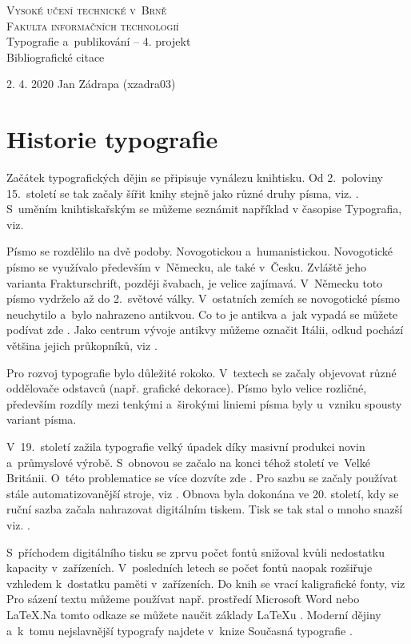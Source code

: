 \documentclass[11pt, a4paper]{article}
\begin{document}
\begin{titlepage}
\begin{center}
{\Huge\textsc{Vysoké učení technické v~Brně}}\\[1em]
{\huge\textsc{Fakulta informačních technologií}}
\\
{\LARGE Typografie a~publikování -- 4. projekt}\\[0.5em]
{\Huge Bibliografické citace}\\
\end{center}
{\Large 2. 4. 2020 \hfill Jan Zádrapa (xzadra03)}
\end{titlepage}

\section*{Historie typografie}
Začátek typografických dějin se připisuje vynálezu knihtisku. Od 2.~poloviny 15.~století se tak začaly šířit knihy stejně jako různé druhy písma, viz. \cite{Donev:2015}. S~uměním knihtiskařským se můžeme seznámit například v časopise Typografia, viz. \cite{Typografia:1892} 

Písmo se rozdělilo na dvě podoby. Novogotickou a~humanistickou. Novogotické písmo se využívalo především v~Německu, ale také v~Česku. Zvláště jeho varianta Frakturschrift, později švabach, je velice zajímavá. V~Německu toto písmo vydrželo až do 2.~světové války.
V~ostatních zemích se novogotické písmo neuchytilo a~bylo nahrazeno antikvou. Co to je antikva a~jak vypadá se můžete podívat zde \cite{Antikva:2006}. Jako centrum vývoje antikvy můžeme označit Itálii, odkud pochází většina jejich průkopníků, viz \cite{Wiki:2004:Typo}.

Pro rozvoj typografie bylo důležité rokoko. V~textech se začaly objevovat různé oddělovače odstavců (např. grafické dekorace). Písmo bylo velice rozličné, především rozdíly mezi tenkými a~širokými liniemi písma byly u~vzniku spousty variant písma.

V~19.~století zažila typografie velký úpadek díky masivní produkci novin a~průmyslové výrobě. S~obnovou se začalo na konci téhož století ve~Velké Británii. O~této problematice se více dozvíte zde \cite{Eric:1931}. Pro sazbu se začaly používat stále automatizovanější stroje, viz \cite{Design:2011}. Obnova byla dokonána ve 20. století, kdy se ruční sazba začala nahrazovat digitálním tiskem. Tisk se tak stal o mnoho snazší viz. \cite{Graham:1992}. 

S~příchodem digitálního tisku se zprvu počet fontů snižoval kvůli nedostatku kapacity v~zařízeních. V~posledních letech se počet fontů naopak rozšiřuje vzhledem k~dostatku paměti v~zařízeních. Do knih se vrací kaligrafické fonty, viz \cite{Eye:2012} Pro sázení textu můžeme používat např. prostředí Microsoft Word nebo \LaTeX.Na tomto odkaze se můžete naučit základy \LaTeX u \cite{Latex:2020}. Moderní dějiny a~k~tomu nejslavnější typografy najdete v~knize Současná typografie \cite{Fabel:1981}.

\newpage


\end{document}
